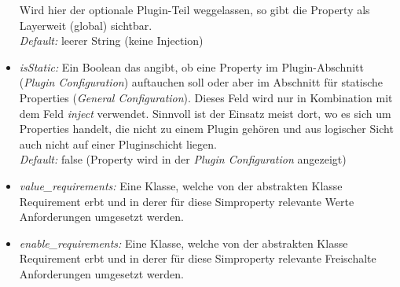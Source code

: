 \documentclass[a4paper, 11pt]{article} %
\begin{document}
\begin{itemize}
	Wird hier der optionale Plugin-Teil weggelassen, so gibt die Property als Layerweit (global) sichtbar.\\
	\emph{Default:} leerer String (keine Injection)
	\item \emph{isStatic:} Ein Boolean das angibt, ob eine Property im Plugin-Abschnitt (\emph{Plugin Configuration}) auftauchen soll oder aber im Abschnitt für statische Properties (\emph{General Configuration}). Dieses Feld wird nur in Kombination mit dem Feld \emph{inject} verwendet. Sinnvoll ist der Einsatz meist dort, wo es sich um Properties handelt, die nicht zu einem Plugin gehören und aus logischer Sicht auch nicht auf einer Pluginschicht liegen.\\
	\emph{Default:} false (Property wird in der \emph{Plugin Configuration} angezeigt)
	\item \emph{value\_requirements:} Eine Klasse, welche von der abstrakten Klasse Requirement erbt und in derer für diese Simproperty relevante Werte Anforderungen umgesetzt werden.
	\item \emph{enable\_requirements:} Eine Klasse, welche von der abstrakten Klasse Requirement erbt und in derer für diese Simproperty relevante Freischalte Anforderungen umgesetzt werden.
\end{itemize}
\end{document}

